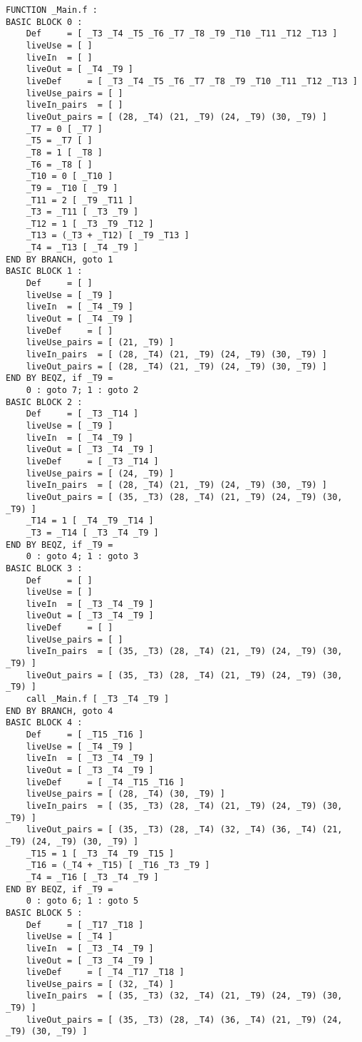 \documentclass{article}
\theoremstyle{plain}
\theoremstyle{definition}
\begin{document}
\begin{lstlisting}
FUNCTION _Main.f : 
BASIC BLOCK 0 : 
    Def     = [ _T3 _T4 _T5 _T6 _T7 _T8 _T9 _T10 _T11 _T12 _T13 ]
    liveUse = [ ]
    liveIn  = [ ]
    liveOut = [ _T4 _T9 ]
    liveDef     = [ _T3 _T4 _T5 _T6 _T7 _T8 _T9 _T10 _T11 _T12 _T13 ]
    liveUse_pairs = [ ]
    liveIn_pairs  = [ ]
    liveOut_pairs = [ (28, _T4) (21, _T9) (24, _T9) (30, _T9) ]
    _T7 = 0 [ _T7 ]
    _T5 = _T7 [ ]
    _T8 = 1 [ _T8 ]
    _T6 = _T8 [ ]
    _T10 = 0 [ _T10 ]
    _T9 = _T10 [ _T9 ]
    _T11 = 2 [ _T9 _T11 ]
    _T3 = _T11 [ _T3 _T9 ]
    _T12 = 1 [ _T3 _T9 _T12 ]
    _T13 = (_T3 + _T12) [ _T9 _T13 ]
    _T4 = _T13 [ _T4 _T9 ]
END BY BRANCH, goto 1
BASIC BLOCK 1 : 
    Def     = [ ]
    liveUse = [ _T9 ]
    liveIn  = [ _T4 _T9 ]
    liveOut = [ _T4 _T9 ]
    liveDef     = [ ]
    liveUse_pairs = [ (21, _T9) ]
    liveIn_pairs  = [ (28, _T4) (21, _T9) (24, _T9) (30, _T9) ]
    liveOut_pairs = [ (28, _T4) (21, _T9) (24, _T9) (30, _T9) ]
END BY BEQZ, if _T9 = 
    0 : goto 7; 1 : goto 2
BASIC BLOCK 2 : 
    Def     = [ _T3 _T14 ]
    liveUse = [ _T9 ]
    liveIn  = [ _T4 _T9 ]
    liveOut = [ _T3 _T4 _T9 ]
    liveDef     = [ _T3 _T14 ]
    liveUse_pairs = [ (24, _T9) ]
    liveIn_pairs  = [ (28, _T4) (21, _T9) (24, _T9) (30, _T9) ]
    liveOut_pairs = [ (35, _T3) (28, _T4) (21, _T9) (24, _T9) (30, _T9) ]
    _T14 = 1 [ _T4 _T9 _T14 ]
    _T3 = _T14 [ _T3 _T4 _T9 ]
END BY BEQZ, if _T9 = 
    0 : goto 4; 1 : goto 3
BASIC BLOCK 3 : 
    Def     = [ ]
    liveUse = [ ]
    liveIn  = [ _T3 _T4 _T9 ]
    liveOut = [ _T3 _T4 _T9 ]
    liveDef     = [ ]
    liveUse_pairs = [ ]
    liveIn_pairs  = [ (35, _T3) (28, _T4) (21, _T9) (24, _T9) (30, _T9) ]
    liveOut_pairs = [ (35, _T3) (28, _T4) (21, _T9) (24, _T9) (30, _T9) ]
    call _Main.f [ _T3 _T4 _T9 ]
END BY BRANCH, goto 4
BASIC BLOCK 4 : 
    Def     = [ _T15 _T16 ]
    liveUse = [ _T4 _T9 ]
    liveIn  = [ _T3 _T4 _T9 ]
    liveOut = [ _T3 _T4 _T9 ]
    liveDef     = [ _T4 _T15 _T16 ]
    liveUse_pairs = [ (28, _T4) (30, _T9) ]
    liveIn_pairs  = [ (35, _T3) (28, _T4) (21, _T9) (24, _T9) (30, _T9) ]
    liveOut_pairs = [ (35, _T3) (28, _T4) (32, _T4) (36, _T4) (21, _T9) (24, _T9) (30, _T9) ]
    _T15 = 1 [ _T3 _T4 _T9 _T15 ]
    _T16 = (_T4 + _T15) [ _T16 _T3 _T9 ]
    _T4 = _T16 [ _T3 _T4 _T9 ]
END BY BEQZ, if _T9 = 
    0 : goto 6; 1 : goto 5
BASIC BLOCK 5 : 
    Def     = [ _T17 _T18 ]
    liveUse = [ _T4 ]
    liveIn  = [ _T3 _T4 _T9 ]
    liveOut = [ _T3 _T4 _T9 ]
    liveDef     = [ _T4 _T17 _T18 ]
    liveUse_pairs = [ (32, _T4) ]
    liveIn_pairs  = [ (35, _T3) (32, _T4) (21, _T9) (24, _T9) (30, _T9) ]
    liveOut_pairs = [ (35, _T3) (28, _T4) (36, _T4) (21, _T9) (24, _T9) (30, _T9) ]

\end{lstlisting}
\end{document}
